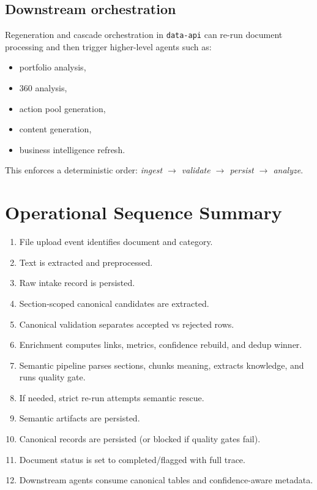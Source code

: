 \documentclass[11pt,a4paper]{article}
\begin{document}
\subsection{Downstream orchestration}
Regeneration and cascade orchestration in \texttt{data-api} can re-run document processing and then trigger higher-level agents such as:
\begin{itemize}[leftmargin=*]
  \item portfolio analysis,
  \item 360 analysis,
  \item action pool generation,
  \item content generation,
  \item business intelligence refresh.
\end{itemize}

This enforces a deterministic order: \textit{ingest $\rightarrow$ validate $\rightarrow$ persist $\rightarrow$ analyze}.

\section{Operational Sequence Summary}
\begin{enumerate}[leftmargin=*]
  \item File upload event identifies document and category.
  \item Text is extracted and preprocessed.
  \item Raw intake record is persisted.
  \item Section-scoped canonical candidates are extracted.
  \item Canonical validation separates accepted vs rejected rows.
  \item Enrichment computes links, metrics, confidence rebuild, and dedup winner.
  \item Semantic pipeline parses sections, chunks meaning, extracts knowledge, and runs quality gate.
  \item If needed, strict re-run attempts semantic rescue.
  \item Semantic artifacts are persisted.
  \item Canonical records are persisted (or blocked if quality gates fail).
  \item Document status is set to completed/flagged with full trace.
  \item Downstream agents consume canonical tables and confidence-aware metadata.
\end{enumerate}
\end{document}
